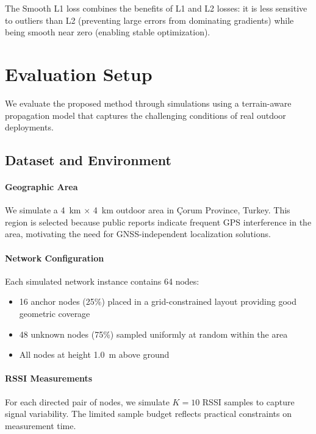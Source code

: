 \documentclass[master,final,11pt]{iscs-thesis}
\begin{document}
The Smooth L1 loss combines the benefits of L1 and L2 losses: it is less sensitive to outliers than L2 (preventing large errors from dominating gradients) while being smooth near zero (enabling stable optimization).

\section{Evaluation Setup}
\label{sec:infra_evaluation}

We evaluate the proposed method through simulations using a terrain-aware propagation model that captures the challenging conditions of real outdoor deployments.

\subsection{Dataset and Environment}

\paragraph{Geographic Area}
We simulate a 4~km $\times$ 4~km outdoor area in \c{C}orum Province, Turkey.
This region is selected because public reports indicate frequent GPS interference in the area, motivating the need for GNSS-independent localization solutions.

\paragraph{Network Configuration}
Each simulated network instance contains 64 nodes:
\begin{itemize}
    \item 16 anchor nodes (25\%) placed in a grid-constrained layout providing good geometric coverage
    \item 48 unknown nodes (75\%) sampled uniformly at random within the area
    \item All nodes at height 1.0~m above ground
\end{itemize}

\paragraph{RSSI Measurements}
For each directed pair of nodes, we simulate $K = 10$ RSSI samples to capture signal variability.
The limited sample budget reflects practical constraints on measurement time.
\end{document}

